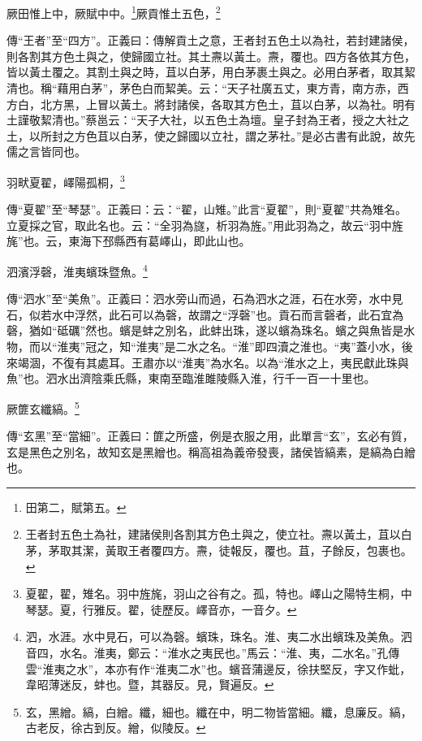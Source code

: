 厥田惟上中，厥賦中中。\footnote{田第二，賦第五。}厥貢惟土五色，\footnote{王者封五色土為社，建諸侯則各割其方色土與之，使立社。燾以黃土，苴以白茅，茅取其潔，黃取王者覆四方。燾，徒報反，覆也。苴，子餘反，包裹也。}

{\noindent\zhuan{}\fzbyks 傳“王者”至“四方”。正義曰：傳解貢土之意，王者封五色土以為社，若封建諸侯，則各割其方色土與之，使歸國立社。其土燾以黃土。燾，覆也。四方各依其方色，皆以黃土覆之。其割土與之時，苴以白茅，用白茅裹土與之。必用白茅者，取其絜清也。稱“藉用白茅”，茅色白而絜美。云：“天子社廣五丈，東方青，南方赤，西方白，北方黑，上冒以黃土。將封諸侯，各取其方色土，苴以白茅，以為社。明有土謹敬絜清也。”蔡邕云：“天子大社，以五色土為壇。皇子封為王者，授之大社之土，以所封之方色苴以白茅，使之歸國以立社，謂之茅社。”是必古書有此說，故先儒之言皆同也。 \par}

羽畎夏翟，嶧陽孤桐，\footnote{夏翟，翟，雉名。羽中旌旄，羽山之谷有之。孤，特也。嶧山之陽特生桐，中琴瑟。夏，行雅反。翟，徒歷反。嶧音亦，一音夕。}

{\noindent\zhuan{}\fzbyks 傳“夏翟”至“琴瑟”。正義曰：云：“翟，山雉。”此言“夏翟”，則“夏翟”共為雉名。立夏採之官，取此名也。云：“全羽為旞，析羽為旌。”用此羽為之，故云“羽中旌旄”也。云，東海下邳縣西有葛嶧山，即此山也。 \par}

泗濱浮磬，淮夷蠙珠暨魚。\footnote{泗，水涯。水中見石，可以為磬。蠙珠，珠名。淮、夷二水出蠙珠及美魚。泗音四，水名。淮夷，鄭云：“淮水之夷民也。”馬云：“淮、夷，二水名。”孔傳雲“淮夷之水”，本亦有作“淮夷二水”也。蠙音蒲邊反，徐扶堅反，字又作蚍，韋昭薄迷反，蚌也。暨，其器反。見，賢遍反。}

{\noindent\zhuan{}\fzbyks 傳“泗水”至“美魚”。正義曰：泗水旁山而過，石為泗水之涯，石在水旁，水中見石，似若水中浮然，此石可以為磬，故謂之“浮磬”也。貢石而言磬者，此石宜為磬，猶如“砥礪”然也。蠙是蚌之別名，此蚌出珠，遂以蠙為珠名。蠙之與魚皆是水物，而以“淮夷”冠之，知“淮夷”是二水之名。“淮”即四瀆之淮也。“夷”蓋小水，後來竭涸，不復有其處耳。王肅亦以“淮夷”為水名。以為“淮水之上，夷民獻此珠與魚”也。泗水出濟陰乘氏縣，東南至臨淮雎陵縣入淮，行千一百一十里也。 \par}

厥篚玄纖縞。\footnote{玄，黑繒。縞，白繒。纖，細也。纖在中，明二物皆當細。纖，息廉反。縞，古老反，徐古到反。繒，似陵反。}

{\noindent\zhuan{}\fzbyks 傳“玄黑”至“當細”。正義曰：篚之所盛，例是衣服之用，此單言“玄”，玄必有質，玄是黑色之別名，故知玄是黑繒也。稱高祖為義帝發喪，諸侯皆縞素，是縞為白繒也。 \par}

